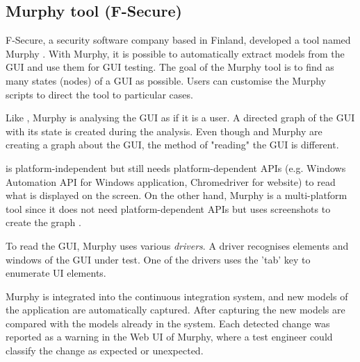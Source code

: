 \subsection{Murphy tool (F-Secure)} \label{sec:murphy-tool}

F-Secure, a security software company based in Finland, developed a tool named Murphy \cite{aho2013industrial}. With Murphy, it is possible to automatically extract models from the GUI and use them for GUI testing. The goal of the Murphy tool is to find as many states (nodes) of a GUI as possible. Users can customise the Murphy scripts to direct the tool to particular cases. 

Like \testar, Murphy is analysing the GUI as if it is a user. A directed graph of the GUI with its state is created during the analysis. Even though \testar and Murphy are creating a graph about the GUI, the method of "reading" the GUI is different.

\testar is platform-independent but still needs platform-dependent APIs (e.g. Windows Automation API for Windows application, Chromedriver for website) to read what is displayed on the screen. On the other hand, Murphy is a multi-platform tool since it does not need platform-dependent APIs but uses screenshots to create the graph \cite{aho2013industrial}.

To read the GUI, Murphy uses various \emph{drivers}. A driver recognises elements and windows of the GUI under test. One of the drivers uses the 'tab' key to enumerate UI elements. 

Murphy is integrated into the continuous integration system, and new models of the application are automatically captured. After capturing the new models are compared with the models already in the system. Each detected change was reported as a warning in the Web UI of Murphy, where a test engineer could classify the change as expected or unexpected. 

